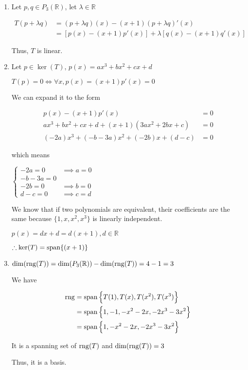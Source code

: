 \begin{sol}
	\begin{enumerate}
		\item Let $p, q \in P_3(\mathbb{R})$, let $\lambda \in \mathbb{R}$
		
		\begin{align*}
			T(p + \lambda q) &= (p+\lambda q)(x) - (x+1)(p + \lambda q)'(x)\\
			&= \left[p(x) - (x+1)p'(x)\right] + \lambda \left[q(x) - (x+1)q'(x)\right]
		\end{align*}

		Thus, $T$ is linear.

		\item Let $p \in \ker(T)$, $p(x) = ax^3 + bx^2 + cx + d$
		
		$T(p) = 0 \iff \forall x, p(x) = (x+1) p'(x) = 0$

		We can expand it to the form

		\begin{align*}
			p(x) - (x+1)p'(x) &= 0\\
			ax^3 + bx^2 + cx + d + (x+1)(3ax^2 + 2bx + c) &= 0\\
			(-2a)x^3 + (-b-3a)x^2 + (-2b)x + (d-c) &= 0
		\end{align*}

		which means

		$\begin{cases}
			-2a = 0 &\implies a = 0\\
			-b-3a = 0\\
			-2b = 0 &\implies b = 0\\
			d-c = 0 &\implies c = d
		\end{cases}$

		\begin{tcolorbox}
			We know that if two polynomials are equivalent, their coefficients are the same because $\{1,x,x^2,x^3\}$ is linearly independent.
		\end{tcolorbox}

		$p(x) = dx + d = d(x+1), d \in \mathbb{R}$

		$\therefore \ker(T) = \mathrm{span}\{(x+1)\}$

		\item $\dim(\mathrm{rng}(T)) = \dim(P_3(\mathbb{R})) - \dim(\mathrm{rng}(T)) = 4 - 1 = 3$

		We have

		\begin{align*}
			\mathrm{rng} &= \mathrm{span}\left\{T(1), T(x), T(x^2), T(x^3)\right\}\\
			&= \mathrm{span}\left\{1, -1, -x^2 - 2x, -2x^3 - 3x^2\right\}\\
			&= \mathrm{span}\left\{1, -x^2 - 2x, -2x^3 - 3x^2\right\}
		\end{align*}

		It is a spanning set of $\mathrm{rng}(T)$ and $\dim(\mathrm{rng}(T)) = 3$

		Thus, it is a basis.
	\end{enumerate}
\end{sol}

